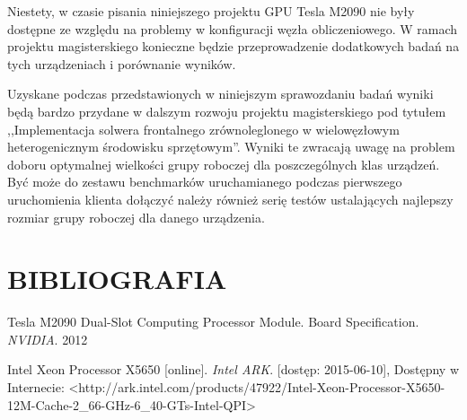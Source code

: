\documentclass[12pt,a4paper,twoside]{article}
\begin{document}
Niestety, w czasie pisania niniejszego projektu GPU Tesla M2090 nie były dostępne ze względu na problemy w konfiguracji węzła obliczeniowego. W ramach projektu magisterskiego konieczne będzie przeprowadzenie dodatkowych badań na tych urządzeniach i porównanie wyników.

Uzyskane podczas przedstawionych w niniejszym sprawozdaniu badań wyniki będą bardzo przydane w dalszym rozwoju projektu magisterskiego pod tytułem ,,Implementacja solwera frontalnego zrównoleglonego w wielowęzłowym heterogenicznym środowisku sprzętowym''. Wyniki te zwracają uwagę na problem doboru optymalnej wielkości grupy roboczej dla poszczególnych klas urządzeń. Być może do zestawu benchmarków uruchamianego podczas pierwszego uruchomienia klienta dołączyć należy również serię testów ustalających najlepszy rozmiar grupy roboczej dla danego urządzenia.

\section{BIBLIOGRAFIA}

\begingroup
\renewcommand{\section}[2]{}%
\begin{thebibliography}{99}

 Tesla M2090 Dual-Slot Computing Processor Module. Board Specification. \textit{NVIDIA}. 2012

 Intel Xeon Processor X5650 [online]. \textit{Intel ARK}. [dostęp: 2015-06-10], Dostępny w Internecie: <http://ark.intel.com/products/47922/Intel-Xeon-Processor-X5650-12M-Cache-2\_66-GHz-6\_40-GTs-Intel-QPI>

\end{thebibliography}
\endgroup
\end{document}
